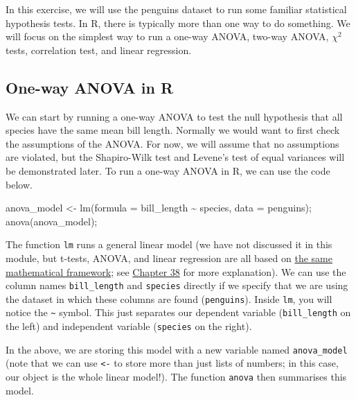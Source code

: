 \documentclass[
]{scrbook}
\newenvironment{Shaded}{\begin{snugshade}}{\end{snugshade}}
\newcommand{\AttributeTok}[1]{\textcolor[rgb]{0.77,0.63,0.00}{#1}}
\newcommand{\FunctionTok}[1]{\textcolor[rgb]{0.00,0.00,0.00}{#1}}
\newcommand{\NormalTok}[1]{#1}
\newcommand{\OtherTok}[1]{\textcolor[rgb]{0.56,0.35,0.01}{#1}}
\newcommand{\SpecialCharTok}[1]{\textcolor[rgb]{0.00,0.00,0.00}{#1}}
\begin{document}
In this exercise, we will use the penguins dataset to run some familiar statistical hypothesis tests.
In R, there is typically more than one way to do something.
We will focus on the simplest way to run a one-way ANOVA, two-way ANOVA, \(\chi^{2}\) tests, correlation test, and linear regression.

\hypertarget{one-way-anova-in-r}{%
\subsection{One-way ANOVA in R}\label{one-way-anova-in-r}}

We can start by running a one-way ANOVA to test the null hypothesis that all species have the same mean bill length.
Normally we would want to first check the assumptions of the ANOVA.
For now, we will assume that no assumptions are violated, but the Shapiro-Wilk test and Levene's test of equal variances will be demonstrated later.
To run a one-way ANOVA in R, we can use the code below.

\begin{Shaded}
\begin{Highlighting}[]
\NormalTok{anova\_model }\OtherTok{\textless{}{-}} \FunctionTok{lm}\NormalTok{(}\AttributeTok{formula =}\NormalTok{ bill\_length }\SpecialCharTok{\textasciitilde{}}\NormalTok{ species, }\AttributeTok{data =}\NormalTok{ penguins);}
\FunctionTok{anova}\NormalTok{(anova\_model);}
\end{Highlighting}
\end{Shaded}

The function \texttt{lm} runs a general linear model (we have not discussed it in this module, but t-tests, ANOVA, and linear regression are all based on \href{https://stirlingcodingclub.github.io/linear_modelling/}{the same mathematical framework}; see \protect\hyperlink{Chapter_38}{Chapter 38} for more explanation).
We can use the column names \texttt{bill\_length} and \texttt{species} directly if we specify that we are using the dataset in which these columns are found (\texttt{penguins}).
Inside \texttt{lm}, you will notice the \texttt{\textasciitilde{}} symbol. This just separates our dependent variable (\texttt{bill\_length} on the left) and independent variable (\texttt{species} on the right).

In the above, we are storing this model with a new variable named \texttt{anova\_model} (note that we can use \texttt{\textless{}-} to store more than just lists of numbers; in this case, our object is the whole linear model!).
The function \texttt{anova} then summarises this model.
\end{document}

